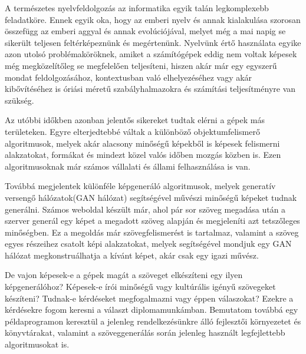 
A természetes nyelvfeldolgozás az informatika egyik talán legkomplexebb feladatköre. Ennek egyik oka, hogy az emberi nyelv és annak kialakulása szorosan összefügg az emberi aggyal és annak evolúciójával, melyet még a mai napig se sikerült teljesen feltérképeznünk és megértenünk. Nyelvünk értő használata egyike azon utolsó problémaköröknek, amiket a számítógépek eddig nem voltak képesek még megközelítőleg se megfelelően teljesíteni, hiszen akár már egy egyszerű mondat feldolgozásához, kontextusban való elhelyezéséhez vagy akár kibővítéséhez is óriási méretű szabályhalmazokra és számítási teljesítményre van szükség. 

Az utóbbi időkben azonban jelentős sikereket tudtak elérni a gépek más területeken. Egyre elterjedtebbé váltak a különböző objektumfelismerő algoritmusok, melyek akár alacsony minőségű képekből is képesek felismerni alakzatokat, formákat és mindezt közel valós időben mozgás közben is. Ezen algoritmusoknak már számos vállalati és állami felhasználása is van. 

Továbbá megjelentek különféle képgeneráló algoritmusok, melyek generatív versengő hálózatok(GAN hálózat) segítségével művészi minőségű képeket tudnak generálni. Számos weboldal készült már, ahol pár sor szöveg megadása után a szerver generál egy képet a megadott szöveg alapján és megjeleníti azt tetszőleges minőségben. Ez a megoldás már szövegfelismerést is tartalmaz, valamint a szöveg egyes részeihez csatolt képi alakzatokat, melyek segítségével mondjuk egy GAN hálózat megkonstruálhatja a kívánt képet, akár csak egy igazi művész.

De vajon képesek-e a gépek magát a szöveget elkészíteni egy ilyen képgenerálóhoz? Képesek-e írói minőségű vagy kultúrális igényű szövegeket készíteni? Tudnak-e kérdéseket megfogalmazni vagy éppen válaszokat? Ezekre a kérdésekre fogom keresni a választ diplomamunkámban. Bemutatom továbbá egy példaprogramon keresztül a jelenleg rendelkezésünkre álló fejlesztői környezetet és könyvtárakat, valamint a szöveggenerálás során jelenleg használt legfejlettebb algoritmusokat is.


